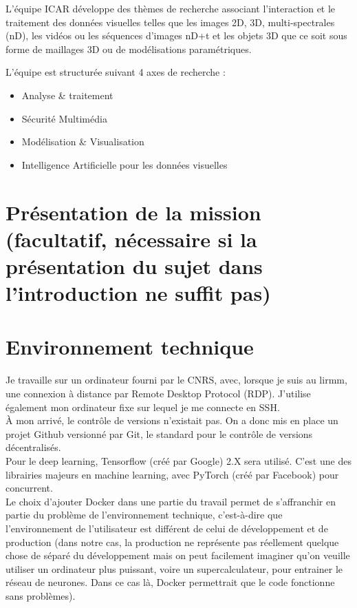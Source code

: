 \documentclass[a4paper,12pt]{article}
\begin{document}
L’équipe ICAR développe des thèmes de recherche associant l’interaction et le traitement des données visuelles telles que les images 2D, 3D, multi-spectrales (nD), les vidéos ou les séquences d’images nD+t et les objets 3D que ce soit sous forme de maillages 3D ou de modélisations paramétriques.\newline

L’équipe est structurée suivant 4 axes de recherche : 
\begin{itemize}
    \item Analyse \& traitement
    \item Sécurité Multimédia
    \item Modélisation \& Visualisation
    \item Intelligence Artificielle pour les données visuelles
\end{itemize}


\section{Présentation de la mission (facultatif, nécessaire si la présentation du sujet dans l'introduction ne suffit pas) }


\section{Environnement technique} 
Je travaille sur un ordinateur fourni par le CNRS, avec, lorsque je suis au lirmm, une connexion à distance par Remote Desktop Protocol (RDP). J'utilise également mon ordinateur fixe sur lequel je me connecte en SSH. \\

À mon arrivé, le contrôle de versions n'existait pas. On a donc mis en place un projet Github versionné par Git, le standard pour le contrôle de versions décentralisés. \\

Pour le deep learning, Tensorflow (créé par Google) 2.X sera utilisé. C'est une des librairies majeurs en machine learning, avec PyTorch (créé par Facebook) pour concurrent. \\

Le choix d'ajouter Docker dans une partie du travail permet de s'affranchir en partie du problème de l'environnement technique, c'est-à-dire que l'environnement de l'utilisateur est différent de celui de développement et de production (dans notre cas, la production ne représente pas réellement quelque chose de séparé du développement mais on peut facilement imaginer qu'on veuille utiliser un ordinateur plus puissant, voire un supercalculateur, pour entrainer le réseau de neurones. Dans ce cas là, Docker permettrait que le code fonctionne sans problèmes).
\end{document}
